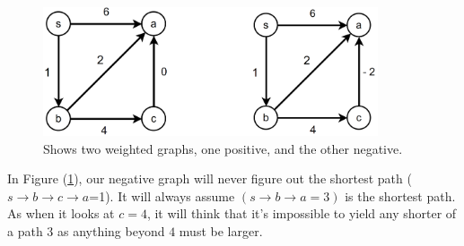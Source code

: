 \begin{figure}[h]
    \begin{center}
      \includegraphics[height=1.5in]{./Sections/dstra/dstra_neg.png}
    \end{center}
     \caption{Shows two weighted graphs, one positive, and the other negative.}\label{fig:dstra_neg}
\end{figure}

\noindent
In Figure (\ref{fig:dstra_neg}), our negative graph will never figure out the shortest path ($s\to b\to c\to a$=1). It 
will always assume $(s\to b\to a=3)$ is the shortest path. As when it looks at $c=4$, it will think that it's 
impossible to yield any shorter of a path $3$ as anything beyond $4$ must be larger.

